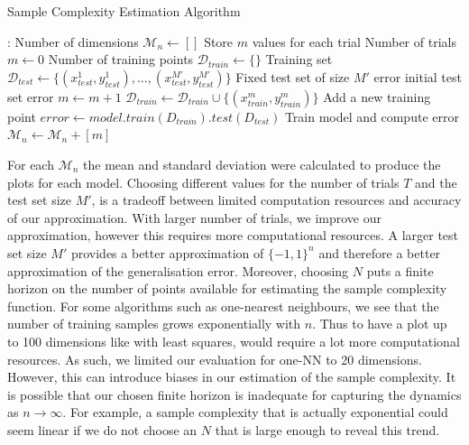 \documentclass[12pt]{article}
\begin{document}
\begin{itemize}
    \begin{algorithm}
    \caption{Sample Complexity Estimation Algorithm}\label{alg:cap}
    \begin{algorithmic}
    : \Comment Number of dimensions
        \State $\mathcal{M}_n \gets []$ \Comment Store $m$ values for each trial
         \Comment Number of trials
            \State $m \gets  0$ \Comment Number of training points
            \State $\mathcal{D}_{train} \gets  \{\}$ \Comment Training set
            \State $\mathcal{D}_{test} \gets  \{(x^1_{test}, y^1_{test}), ..., (x^{M'}_{test}, y^{M'}_{test})\}$ \Comment Fixed test set of size $M'$
            \State  error  \Comment initial test set error
                \State $m \gets  m+1$
                \State $\mathcal{D}_{train} \gets  \mathcal{D}_{train} \cup \{(x^m_{train}, y^m_{train})\}$ \Comment Add a new training point
                \State $error \gets model.train({D}_{train}).test({D}_{test})$ \Comment Train model and compute error
            \EndWhile
            \State $\mathcal{M}_n \gets \mathcal{M}_n + [m]$
        \EndFor
    \end{algorithmic}
    \end{algorithm}
    For each $\mathcal{M}_n$ the mean and standard deviation were calculated to produce the plots for each model.
    Choosing different values for the number of trials $T$ and the test set size $M'$, is a tradeoff between limited computation resources and accuracy of our approximation. With larger number of trials, we improve our approximation, however this requires more computational resources. A larger test set size $M'$ provides a better approximation of $\{-1 ,1\}^n$ and therefore a better approximation of the generalisation error. Moreover, choosing $N$ puts a finite horizon on the number of points available for estimating the sample complexity function. For some algorithms such as one-nearest neighbours, we see that the number of training samples grows exponentially with $n$. Thus to have a plot up to 100 dimensions like with least squares, would require a lot more computational resources. As such, we limited our evaluation for one-NN to 20 dimensions. However, this can introduce biases in our estimation of the sample complexity. It is possible that our chosen finite horizon is inadequate for capturing the dynamics as $n \rightarrow \infty$. For example, a sample complexity that is actually exponential could seem linear if we do not choose an $N$ that is large enough to reveal this trend.


\end{itemize}
\end{document}
